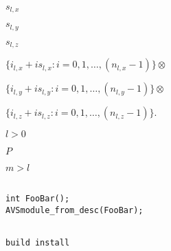 {\newpage\clearpage
{}%
$s_{l,x}$%
\lthtmlinlinemathZ
\lthtmlcheckvsize\clearpage}

{\newpage\clearpage
{}%
$s_{l,y}$%
\lthtmlinlinemathZ
\lthtmlcheckvsize\clearpage}

{\newpage\clearpage
{}%
$s_{l,z}$%
\lthtmlinlinemathZ
\lthtmlcheckvsize\clearpage}

{\newpage\clearpage
{}%
$\displaystyle \{ i_{l,x} + i s_{l,x} : i = 0, 1, \ldots, (n_{l,x}-1) \} \otimes$%
\lthtmlindisplaymathZ
\lthtmlcheckvsize\clearpage}

{\newpage\clearpage
{}%
$\displaystyle \{ i_{l,y} + i s_{l,y} : i = 0, 1, \ldots, (n_{l,y}-1) \} \otimes$%
\lthtmlindisplaymathZ
\lthtmlcheckvsize\clearpage}

{\newpage\clearpage
{}%
$\displaystyle \{ i_{l,z} + i s_{l,z} : i = 0, 1, \ldots, (n_{l,z}-1) \} .$%
\lthtmlindisplaymathZ
\lthtmlcheckvsize\clearpage}

{\newpage\clearpage
{}%
$l > 0$%
\lthtmlinlinemathZ
\lthtmlcheckvsize\clearpage}

{\newpage\clearpage
{}%
$P$%
\lthtmlinlinemathZ
\lthtmlcheckvsize\clearpage}

{\newpage\clearpage
{}%
$m > l$%
\lthtmlinlinemathZ
\lthtmlcheckvsize\clearpage}

{\newpage\clearpage
{}%
\begin{display}\begin{verbatim}

int FooBar();
AVSmodule_from_desc(FooBar);\end{verbatim}
\end{display}%
\lthtmlfigureZ
\lthtmlcheckvsize\clearpage}

{\newpage\clearpage
{}%
\begin{display}\begin{verbatim}

build install\end{verbatim}
\end{display}%
\lthtmlfigureZ
\lthtmlcheckvsize\clearpage}

